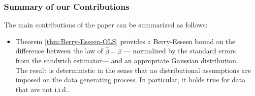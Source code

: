 \documentclass[11pt]{article}
\let\hat\widehat
\begin{document}



\subsubsection*{Summary of our Contributions}
The main
contributions of the paper can be summarized as follows:
\begin{itemize}
\item Theorem \ref{thm:Berry-Esseen-OLS} 
provides a Berry-Esseen bound
on the difference between
the law of $\hat\beta - \beta$ ---
normalized by the standard errors from the sandwich estimator---
and an appropriate Gaussian distribution.
The result is deterministic in the sense that
no distributional assumptions are imposed
on the data generating process. In particular, it holds true for data that are not i.i.d..


\end{itemize}
\end{document}

